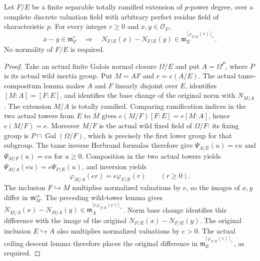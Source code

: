 \begin{lemma}
\label{fw:nonnormal-wild-norm-continuity}
\leanok
Let $F/E$ be a finite separable totally ramified extension of
$p$-power degree, over a complete discrete valuation field
with arbitrary perfect residue field of characteristic $p$.
For every integer $r\geq0$ and $x,y\in\mathcal O_F$,
\[
 x-y\in\mathfrak m_F^r\quad\Longrightarrow\quad
 N_{F/E}(x)-N_{F/E}(y)
 \in\mathfrak m_E^{\lceil\varphi_{F/E}(r)\rceil_+}.
\]
No normality of $F/E$ is required.
\end{lemma}
\begin{proof}
Take an actual finite Galois normal closure $\Omega/E$ and
put $A=\Omega^P$, where $P$ is its actual wild inertia group.
Put $M=AF$ and $e=e(A/E)$.
The actual tame-compositum lemma makes $A$ and $F$ linearly
disjoint over $E$, identifies $[M:A]=[F:E]$, and identifies
the base change of the original norm with $N_{M/A}$.
The extension $M/A$ is totally ramified. Comparing ramification
indices in the two actual towers from $E$ to $M$ gives
$e(M/F)[F:E]=e[M:A]$, hence $e(M/F)=e$.
Moreover $M/F$ is the actual wild fixed field of $\Omega/F$:
its fixing group is $P\cap\operatorname{Gal}(\Omega/F)$,
which is precisely the first lower group for that subgroup.
The tame inverse Herbrand formulas therefore give
$\Psi_{A/E}(u)=eu$ and $\Psi_{M/F}(u)=eu$ for $u\geq0$.
Composition in the two actual towers yields
$\Psi_{M/A}(eu)=e\Psi_{F/E}(u)$, and inversion yields
\[
 \varphi_{M/A}(er)=e\varphi_{F/E}(r)\qquad(r\geq0).
\]
The inclusion $F\hookrightarrow M$ multiplies normalized
valuations by $e$, so the images of $x,y$ differ in
$\mathfrak m_M^{er}$. The preceding wild-tower lemma gives
$N_{M/A}(x)-N_{M/A}(y)\in
\mathfrak m_A^{\lceil e\varphi_{F/E}(r)\rceil_+}$.
Norm base change identifies this difference with the image
of the original $N_{F/E}(x)-N_{F/E}(y)$.
The original inclusion $E\hookrightarrow A$ also multiplies
normalized valuations by $e>0$.
The actual ceiling descent lemma therefore places the original
difference in
$\mathfrak m_E^{\lceil\varphi_{F/E}(r)\rceil_+}$, as required.
\end{proof}

